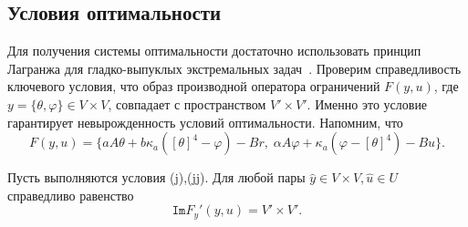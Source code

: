 \subsection{Условия оптимальности}\label{subsec:ch2/sec2/subsec4}


Для получения системы оптимальности достаточно использовать
принцип Лагранжа для гладко-выпуклых экстремальных задач~\cite{11,10}.
Проверим справедливость ключевого условия, что образ производной
оператора ограничений $F(y, u)$, где $y=\{\theta,\varphi\}\in V\times V$,
совпадает с пространством $V'\times V'$. Именно это условие гарантирует
невырожденность условий оптимальности.
Напомним, что
\[
    F(y, u) = \{ aA\theta + b \kappa_a ( [\theta]^4- \varphi) - Br,\;
    \alpha A \varphi + \kappa_a (\varphi -[\theta]^4) - Bu\}.
\]

\begin{lemma}
    \label{lm:2_2:2}
    Пусть выполняются условия (j),(jj).
    Для любой пары $\hat{y} \in V \times V, \hat{u} \in U$ справедливо равенство
    \[
        \texttt{Im}F_y'(y, u) = V' \times V'.
    \]
\end{lemma}


